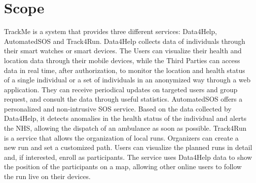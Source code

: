 \section{Scope}
TrackMe is a system that provides three different services: Data4Help, AutomatedSOS and Track4Run.
Data4Help collects data of individuals through their smart watches or smart devices. The Users can visualize their health and location data through their mobile devices, while the Third Parties can access data in real time, after authorization, to monitor the location and health status of a single individual or a set of individuals in an anonymized way through a web application. They can receive periodical updates on targeted users and group request, and consult the data through useful statistics.
AutomatedSOS offers a personalized and non-intrusive SOS service. Based on the data collected by Data4Help, it detects anomalies in the health status of the individual and alerts the NHS, allowing the dispatch of an ambulance as soon as possible.
Track4Run is a service that allows the organization of local runs. Organizers can create a new run and set a customized path. Users can visualize the planned runs in detail and, if interested, enroll as participants. The service uses Data4Help data to show the position of the participants on a map, allowing other online users to follow the run live on their devices.


